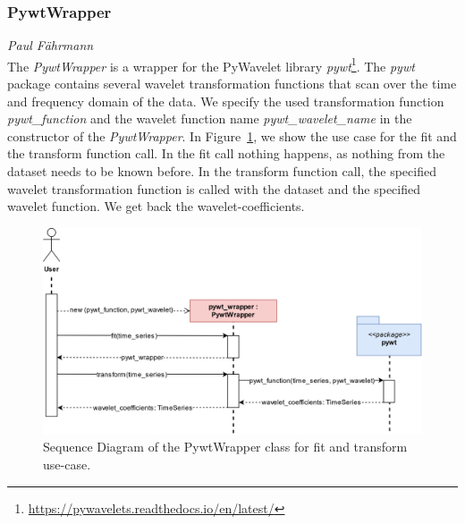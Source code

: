 \subsubsection*{PywtWrapper}
\vspace*{-10mm}\hfill{\normalsize\emph{Paul Fährmann}}
\\
The \textit{PywtWrapper} is a wrapper for the PyWavelet library \textit{pywt}\footnote{\href{https://pywavelets.readthedocs.io/en/latest/}{https://pywavelets.readthedocs.io/en/latest/}}. The \textit{pywt} package contains several wavelet transformation functions that scan over the time and frequency domain of the data. We specify the used transformation function \textit{pywt\_function} and the wavelet function name \textit{pywt\_wavelet\_name} in the constructor of the \textit{PywtWrapper}. In Figure~\ref{fig:tfe-pywt-seq}, we show the use case for the fit and the transform function call. In the fit call nothing happens, as nothing from the dataset needs to be known before. In the transform function call, the specified wavelet transformation function is called with the dataset and the specified wavelet function. We get back the wavelet-coefficients.
\begin{figure}[ht]
    \centering
    \includegraphics[width=\textwidth]{gfx/pywt_sequence}
    \caption{Sequence Diagram of the PywtWrapper class for fit and transform use-case.}
    \label{fig:tfe-pywt-seq}
\end{figure}
\newpage
